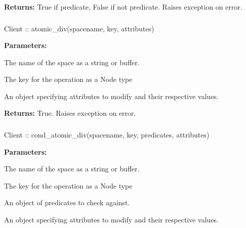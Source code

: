 \noindent\textbf{Returns:}
True if predicate, False if not predicate.  Raises exception on error.

\subsubsection{}
\label{api:nodejs:atomic_div}
\begin{javascriptcode}
Client :: atomic_div(spacename, key, attributes)
\end{javascriptcode}


\noindent\textbf{Parameters:}
\begin{description}[labelindent=\widthof{{\code{attributes}}},leftmargin=*,noitemsep,nolistsep,align=right]
\item[\code{spacename}] The name of the space as a string or buffer.
\item[\code{key}] The key for the operation as a Node type
\item[\code{attributes}] An object specifying attributes to modify and their respective values.
\end{description}

\noindent\textbf{Returns:}
True.  Raises exception on error.

\subsubsection{}
\label{api:nodejs:cond_atomic_div}
\begin{javascriptcode}
Client :: cond_atomic_div(spacename, key, predicates, attributes)
\end{javascriptcode}


\noindent\textbf{Parameters:}
\begin{description}[labelindent=\widthof{{\code{predicates}}},leftmargin=*,noitemsep,nolistsep,align=right]
\item[\code{spacename}] The name of the space as a string or buffer.
\item[\code{key}] The key for the operation as a Node type
\item[\code{predicates}] An object of predicates to check against.
\item[\code{attributes}] An object specifying attributes to modify and their respective values.
\end{description}

